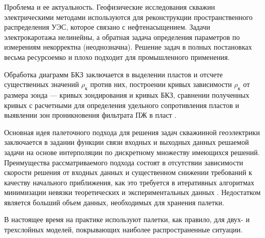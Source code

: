 
Проблема и ее актуальность. Геофизические исследования скважин
электрическими методами используются для
реконструкции пространственного распределения
УЭС, которое связано с нефтенасыщением.
Задачи электрокаротажа нелинейны, а обратная
задача определения параметров по измерениям
некорректна (неоднозначна). Решение задач в
полных постановках весьма ресурсоемко и плохо
подходит для промышленного применения.

Обработка диаграмм БКЗ заключается в выделении пластов
и отсчете существенных значений $\rho_\text {к}$ против них, построении
кривых зависимости $\rho_\text {к}$ от размера зонда --- кривых зондирования
и кривых БКЗ, сравнении полученных кривых с расчетными
для определения удельного сопротивления пластов и выявлении
зон проникновения фильтрата ПЖ в пласт \cite{valiullin}.

Основная идея палеточного подхода для решения задач скважинной
геоэлектрики заключается в задании функции связи входных
и выходных данных решаемой задачи на основе интерполяции по
дискретному множеству имеющихся решений.
Преимущества рассматриваемого
подхода состоят в отсутствии зависимости скорости
решения от входных данных и существенном снижении требований к
качеству начального приближения, как это требуется в итеративных алгоритмах
минимизации невязки теоретических и экспериментальных данных \cite{palette}.
Недостатком является больший объем данных, необходимых для хранения палетки.

В настоящее
время на практике используют палетки, как правило, для
двух- и трехслойных моделей, покрывающих наиболее
распространенные ситуации.


\clearpage
